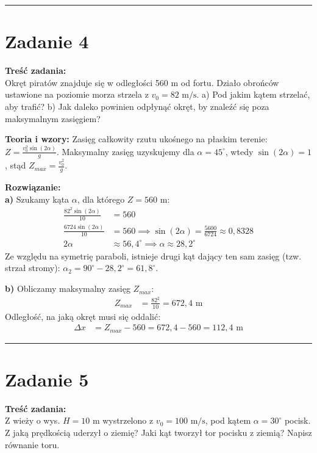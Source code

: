 \documentclass[11pt, a4paper]{article}
\begin{document}
\vspace{0.5cm}
\hrule
\vspace{0.5cm}

\section*{Zadanie 4}

\textbf{Treść zadania:} \\
Okręt piratów znajduje się w odległości 560 m od fortu. Działo obrońców ustawione na poziomie morza strzela z $v_{0}=82 \text{ m/s}$. a) Pod jakim kątem strzelać, aby trafić? b) Jak daleko powinien odpłynąć okręt, by znaleźć się poza maksymalnym zasięgiem?

\textbf{Teoria i wzory:}
Zasięg całkowity rzutu ukośnego na płaskim terenie: $Z = \frac{v_0^2 \sin(2\alpha)}{g}$. Maksymalny zasięg uzyskujemy dla $\alpha = 45^\circ$, wtedy $\sin(2\alpha)=1$, stąd $Z_{max} = \frac{v_0^2}{g}$.

\textbf{Rozwiązanie:} \\
\textbf{a)} Szukamy kąta $\alpha$, dla którego $Z = 560 \text{ m}$:
\begin{align*}
    \frac{82^2 \sin(2\alpha)}{10} &= 560 \\
    \frac{6724 \sin(2\alpha)}{10} &= 560 \implies \sin(2\alpha) = \frac{5600}{6724} \approx 0,8328 \\
    2\alpha &\approx 56,4^\circ \implies \alpha \approx 28,2^\circ
\end{align*}
Ze względu na symetrię paraboli, istnieje drugi kąt dający ten sam zasięg (tzw. strzał stromy): $\alpha_2 = 90^\circ - 28,2^\circ = 61,8^\circ$.

\textbf{b)} Obliczamy maksymalny zasięg $Z_{max}$:
\begin{align*}
    Z_{max} &= \frac{82^2}{10} = 672,4 \text{ m}
\end{align*}
Odległość, na jaką okręt musi się oddalić:
\begin{align*}
    \Delta x &= Z_{max} - 560 = 672,4 - 560 = 112,4 \text{ m}
\end{align*}

\vspace{0.5cm}
\hrule
\vspace{0.5cm}

\section*{Zadanie 5}

\textbf{Treść zadania:} \\
Z wieży o wys. $H=10$ m wystrzelono z $v_0=100 \text{ m/s}$, pod kątem $\alpha=30^\circ$ pocisk. Z jaką prędkością uderzył o ziemię? Jaki kąt tworzył tor pocisku z ziemią? Napisz równanie toru.
\end{document}
